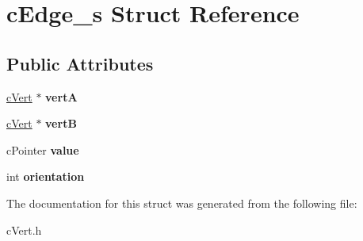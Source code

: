 \hypertarget{structcEdge__s}{}\section{c\+Edge\+\_\+s Struct Reference}
\label{structcEdge__s}
\subsection*{Public Attributes}
\begin{DoxyCompactItemize}
\item 
\mbox{\label{structcEdge__s_a358ee1b08a2a66f3e49eddafe6a61d48}} 
\mbox{\hyperlink{structcVert__s}{c\+Vert}} $\ast$ {\bfseries vertA}
\item 
\mbox{\label{structcEdge__s_aafa6690edd08f5049b383fd9e4200a38}} 
\mbox{\hyperlink{structcVert__s}{c\+Vert}} $\ast$ {\bfseries vertB}
\item 
\mbox{\label{structcEdge__s_afd662b6b926997e73b9889a7c00706fb}} 
c\+Pointer {\bfseries value}
\item 
\mbox{\label{structcEdge__s_a44ff32e4483c6a09a74b468ee7ad0601}} 
int {\bfseries orientation}
\end{DoxyCompactItemize}


The documentation for this struct was generated from the following file\+:\begin{DoxyCompactItemize}
\item 
c\+Vert.\+h\end{DoxyCompactItemize}
